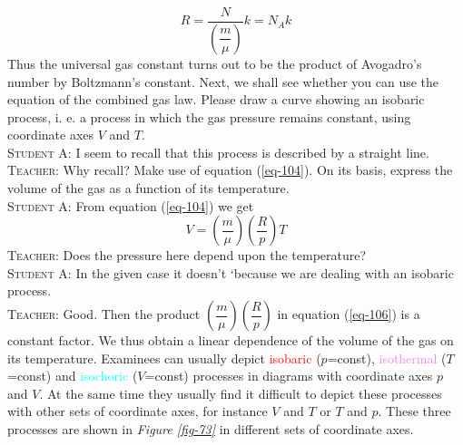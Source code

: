 \documentclass[a4paper,sfsidenotes]{tufte-book}
\begin{document}
\begin{equation}
R=\frac{N}{\left( \dfrac{m}{\mu} \right)} k =N_{A}k
\label{eq-105}
\end{equation}
Thus the universal gas constant turns out to be the product of Avogadro's number by Boltzmann's constant. Next, we shall see whether you can use the equation of the combined gas law. Please draw a curve showing an isobaric process, i. e. a process in which the gas pressure remains constant, using coordinate axes $V$ and $T$.
\\
\textsc{Student A:} I seem to recall that this process is described by a straight line.
\\
\textsc{Teacher:} Why recall? Make use of equation (\ref{eq-104}). On its basis, express the volume of the gas as a function of its temperature.
\\
\textsc{Student A:} From equation (\ref{eq-104}) we get
\begin{equation}%
V = \left( \dfrac{m}{\mu} \right) \left( \dfrac{R}{p} \right) T
\label{106}
\end{equation}
\textsc{Teacher:} Does the pressure here depend upon the temperature?
\\
\textsc{Student A:} In the given case it doesn't `because we are dealing with an isobaric process.
\\
\textsc{Teacher:} Good. Then the product $\left( \dfrac{m}{\mu} \right) \left( \dfrac{R}{p} \right)$ in equation (\ref{eq-106}) is a constant factor. We thus obtain a linear dependence of the volume of the gas on its temperature. Examinees can usually depict \textcolor{red}{isobaric} ($p$=const), \textcolor{violet}{isothermal} ($T$=const) and \textcolor{cyan}{isochoric} ($V$=const) processes in diagrams with coordinate axes $p$ and $V$. At the same time they usually find it difficult to depict these processes with other sets of coordinate axes, for instance $V$ and $T$ or $T$ and $p$. These three processes are shown in \emph{Figure \ref{fig-73}} in different sets of coordinate axes.
\end{document}
